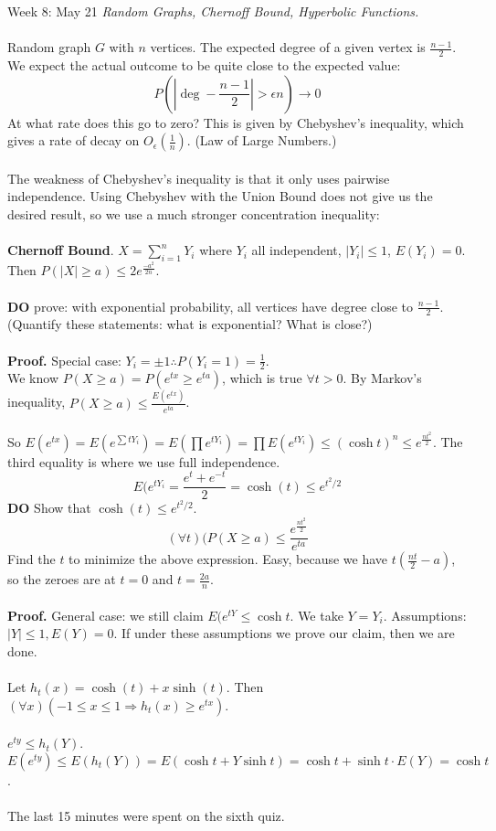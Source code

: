 \documentclass[12pt]{article}
\theoremstyle{remark}
\begin{document}
\label{23}\begin{section}{Week 8: May 21}
\indent\textit{Random Graphs, Chernoff Bound, Hyperbolic Functions.}\\\\
Random graph $G$ with $n$ vertices. The expected degree of a given vertex is $\frac {n-1} 2$. We expect the actual outcome to be quite close to the expected value:
$$P\left(\left|\deg - \frac{n-1} 2\right| > \epsilon n \right) \to 0$$
At what rate does this go to zero? This is given by Chebyshev's inequality, which gives a rate of decay on $O_\epsilon (\frac 1 n)$. (Law of Large Numbers.)
\\\\
The weakness of Chebyshev's inequality is that it only uses pairwise independence. Using Chebyshev with the Union Bound does not give us the desired result, so we use a much stronger concentration inequality:
\\\\
\textbf{Chernoff Bound}. $X = \sum_{i=1}^n Y_i$ where $Y_i$ all independent, $|Y_i| \leq 1$, $E(Y_i) = 0$. Then $P(|X| \geq a) \leq 2 e^{\frac{-a^2}{2n}}$.
\\\\
\textbf{DO} prove: with exponential probability, all vertices have degree  close to $\frac{n-1}{2}$. (Quantify these statements: what is exponential? What is close?)
\\\\
\textbf{Proof.} Special case: $Y_i = \pm 1 \therefore P(Y_i = 1) = \frac 12$.
\\ We know $P(X \geq a) = P(e^{tx} \geq e^{ta})$, which is true $\forall t > 0$. By Markov's inequality, $P(X \geq a) \leq \frac{E(e^{tx})}{e^{ta}}$.
\\\\
So $E(e^{tx}) = E(e^{\sum t Y_i}) = E(\prod e^{tY_i}) = \prod E(e^{tY_i}) \leq (\cosh t)^n \leq e^{\frac{nt^2}{2}}$. The third equality is where we use full independence. 
$$E(e^{tY_i} = \frac{e^t + e^{-t}}{2} = \cosh(t) \leq e^{t^2/2}$$ 
\textbf{DO} Show that $\cosh(t) \leq e^{t^2/2}$.
$$(\forall t)(P(X \geq a) \leq \frac{e^{\frac{nt^2}{2}}}{e^{ta}}$$
Find the $t$ to minimize the above expression. Easy, because we have $ t(\frac{nt}{2}-a)$, so the zeroes are at $t=0$ and $t = \frac {2a} n$.
\\\\
\textbf{Proof.} General case: we still claim $E(e^{tY} \leq \cosh t$. We take $Y = Y_i$. Assumptions: $|Y| \leq 1, E(Y) = 0$. If under these assumptions we prove our claim, then we are done.
\\\\
Let $h_t(x) = \cosh(t) + x \sinh(t)$. Then $(\forall x)(-1 \leq x \leq 1 \Rightarrow h_t(x) \geq e^{tx})$. 
\\\\
$e^{ty} \leq h_t(Y)$. $E(e^{ty}) \leq E(h_t(Y)) = E(\cosh t + Y \sinh t ) = \cosh t + \sinh t \cdot E(Y) = \cosh t$.
\\\\
The last 15 minutes were spent on the sixth quiz. 
\end{section}
\end{document}
